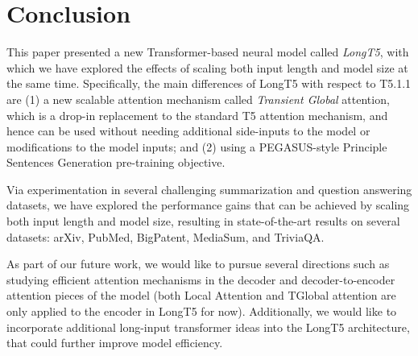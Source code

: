 \documentclass[11pt]{article}
\begin{document}
\section{Conclusion}

This paper presented a new Transformer-based neural model called {\em LongT5}, with which we have explored the effects of scaling both input length and model size at the same time. Specifically, the main differences of LongT5 with respect to T5.1.1 are (1) a new scalable attention mechanism called {\em Transient Global} attention, which is a drop-in replacement to the standard T5 attention mechanism, and hence can be used without needing additional side-inputs to the model or modifications to the model inputs; and (2) using a PEGASUS-style Principle Sentences Generation pre-training objective.

Via experimentation in several challenging summarization and question answering datasets, we have explored the performance gains that can be achieved by scaling both input length and model size, resulting in state-of-the-art results on several datasets: arXiv, PubMed, BigPatent, MediaSum, and TriviaQA.

As part of our future work, we would like to pursue several directions such as studying efficient attention mechanisms in the decoder and decoder-to-encoder attention pieces of the model (both Local Attention and TGlobal attention are only applied to the encoder in LongT5 for now). Additionally, we would like to incorporate additional long-input transformer ideas into the LongT5 architecture, that could further improve model efficiency.
\end{document}
